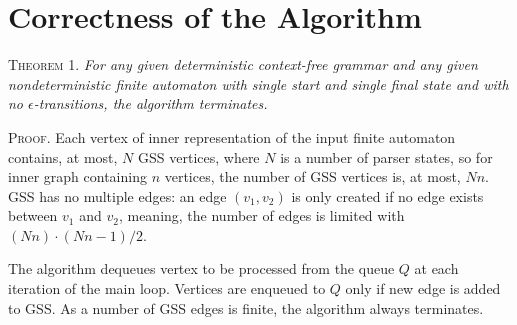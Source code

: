 \section{Correctness of the Algorithm}
\textsc{Theorem 1.} \textit{For any given deterministic context-free grammar and any given nondeterministic
finite automaton with single start and single final state and with no $\epsilon$-transitions,
the algorithm terminates.}

\textsc{Proof.}
Each vertex of inner representation of the input finite automaton contains, at most, 
$N$ GSS vertices, where $N$ is a number of parser states, so for inner graph containing $n$
vertices, the number of GSS vertices is, at most, $Nn$. GSS has no multiple edges:
an edge $(v_{1}, v_{2})$ is only created if no edge exists between $v_{1}$ and $v_{2}$,  
meaning, the number of edges is limited with $(Nn) \cdot (Nn - 1) / 2 $. 

The algorithm dequeues vertex to be processed from the queue $Q$ at each iteration of the 
main loop. Vertices are enqueued to $Q$ only if new edge is added to GSS. As a number of 
GSS edges is finite, the algorithm always terminates. 
